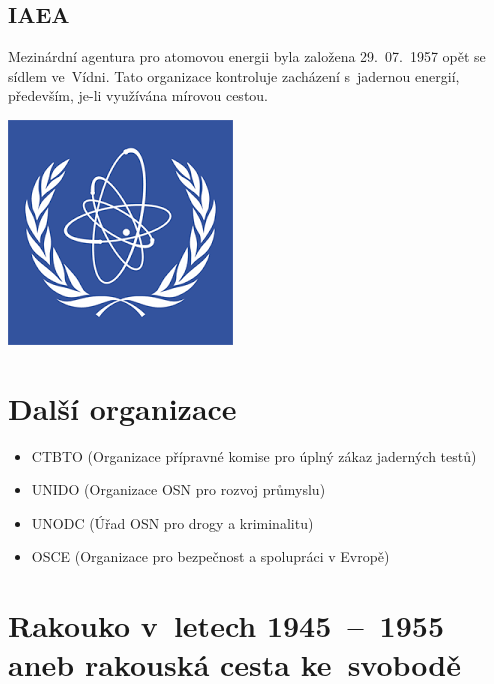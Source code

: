 \documentclass[a2 paper]{article}
\begin{document}
\begin{landscape}
\begin{minipage}[c]{\linewidth}
\begin{minipage}[t]{0.2\linewidth}
	\subsection*{IAEA}
	Mezinárdní agentura pro atomovou energii byla založena 29.~07.~1957 opět se sídlem ve~Vídni. Tato organizace kontroluje zacházení s~jadernou energií, především, je-li využívána mírovou cestou.
	\begin{minipage}[t]{\linewidth}
		\centering
		\includegraphics[width=0.5\linewidth]{images/iaea.png}
	\end{minipage}
	\section*{Další organizace}
	\begin{itemize}
		\item CTBTO (Organizace přípravné komise pro úplný zákaz jaderných testů)
		\item UNIDO (Organizace OSN pro rozvoj průmyslu)
		\item UNODC (Úřad OSN pro drogy a kriminalitu)
		\item OSCE (Organizace pro bezpečnost a spolupráci v Evropě)
	\end{itemize}
\end{minipage}
\hspace{0.5cm}
\begin{minipage}[t]{0.5\linewidth}
	\section*{Rakouko v~letech 1945~--~1955 aneb rakouská cesta ke~svobodě}

\end{minipage}
\end{minipage}
\end{landscape}
\end{document}
